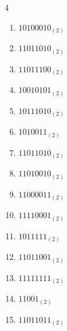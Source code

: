 \begin{multicols}{4}
\begin{enumerate}
        \phantom{$=78$}

  \item $10100010_{(2)}$

        \phantom{$=162$}

\columnbreak %

  \item $11011010_{(2)}$

        \phantom{$=218$}

  \item $11011100_{(2)}$

        \phantom{$=220$}

  \item $10010101_{(2)}$

        \phantom{$=149$}

  \item $10111010_{(2)}$

        \phantom{$=186$}

  \item $1010011_{(2)}$

        \phantom{$=83$}

  \item $11011010_{(2)}$

        \phantom{$=218$}

  \item $11010010_{(2)}$

        \phantom{$=210$}

  \item $11000011_{(2)}$

        \phantom{$=195$}

  \item $11110001_{(2)}$

        \phantom{$=241$}

  \item $1011111_{(2)}$

        \phantom{$=95$}

  \item $11011001_{(2)}$

        \phantom{$=217$}

  \item $11111111_{(2)}$

        \phantom{$=255$}

  \item $11001_{(2)}$

        \phantom{$=25$}

  \item $11011011_{(2)}$


\end{enumerate}
\end{multicols}

